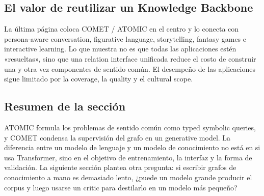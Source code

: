 
\subsection{El valor de reutilizar un Knowledge Backbone}

La última página coloca COMET / ATOMIC en el centro y lo conecta con persona-aware conversation, figurative language, storytelling, fantasy games e interactive learning. Lo que muestra no es que todas las aplicaciones estén «resueltas», sino que una relation interface unificada reduce el costo de construir una y otra vez componentes de sentido común. El desempeño de las aplicaciones sigue limitado por la coverage, la quality y el cultural scope.


\subsection{Resumen de la sección}

ATOMIC formula los problemas de sentido común como typed symbolic queries, y COMET condensa la supervisión del grafo en un generative model. La diferencia entre un modelo de lenguaje y un modelo de conocimiento no está en si usa Transformer, sino en el objetivo de entrenamiento, la interfaz y la forma de validación. La siguiente sección plantea otra pregunta: si escribir grafos de conocimiento a mano es demasiado lento, ¿puede un modelo grande producir el corpus y luego usarse un critic para destilarlo en un modelo más pequeño?
